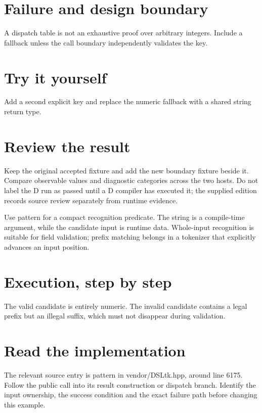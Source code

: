 
\section*{Failure and design boundary}
A dispatch table is not an exhaustive proof over arbitrary integers. Include a fallback unless the call boundary independently validates the key.

\section*{Try it yourself}
Add a second explicit key and replace the numeric fallback with a shared string return type.

\section*{Review the result}
Keep the original accepted fixture and add the new boundary fixture beside it. Compare observable values and diagnostic categories across the two hosts. Do not label the D run as passed until a D compiler has executed it; the supplied edition records source review separately from runtime evidence.

\clearpage
{}
Use pattern for a compact recognition predicate. The string is a compile-time argument, while the candidate input is runtime data. Whole-input recognition is suitable for field validation; prefix matching belongs in a tokenizer that explicitly advances an input position.


\section*{Execution, step by step}
The valid candidate is entirely numeric. The invalid candidate contains a legal prefix but an illegal suffix, which must not disappear during validation.

\section*{Read the implementation}
The relevant source entry is pattern in vendor/DSLtk.hpp, around line 6175. Follow the public call into its result construction or dispatch branch. Identify the input ownership, the success condition and the exact failure path before changing this example.

